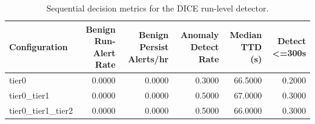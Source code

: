 \begin{table}[t]
\centering
\caption{Sequential decision metrics for the DICE run-level detector.}
\label{tab:dice_sequential_metrics}
\footnotesize
\begin{tabular}{lrrrrr}
\toprule
Configuration & Benign Run-Alert Rate & Benign Persist Alerts/hr & Anomaly Detect Rate & Median TTD (s) & Detect <=300s \\
\midrule
tier0 & 0.0000 & 0.0000 & 0.3000 & 66.5000 & 0.2000 \\
tier0_tier1 & 0.0000 & 0.0000 & 0.5000 & 67.0000 & 0.3000 \\
tier0_tier1_tier2 & 0.0000 & 0.0000 & 0.5000 & 66.0000 & 0.3000 \\
\bottomrule
\end{tabular}

\end{table}
